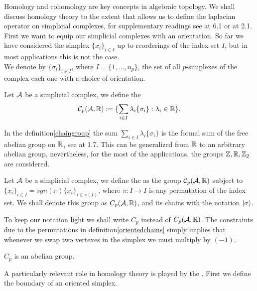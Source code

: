 \documentclass[../1.tex]{subfiles}
\begin{document}
    Homology and cohomology are key concepts in algebraic topology. We shall discuss homology theory to the extent
    that allows us to define the laplacian operator on simplicial complexes, for supplementary readings see \cite{singerthorpe} at 6.1 or \cite{hatcher} at 2.1.
    First we want to equip our simplicial complexes with an orientation. So far we have considered the simplex $\{x_i\}_{i \in I}$ up to reorderings of the index set $I$, but in most applications this is not the case.\\
   
    We denote by $\{\sigma_i\}_{i \in I}$, where $I = \{1,...,n_p\}$, the set of all $p$-simplexes of the complex each one with a choice
    of orientation.

    \begin{defn}
        \label{chaingroup}
        Let $\mathcal{A}$ be a simplicial complex, we define the  
        \[ \mathcal{C}_p(\mathcal{A},\mathbb{R}) := \{ \sum_{i \in I} \lambda_i \{\sigma_i\} : \lambda_i \in \mathbb{R} \}.\]
    \end{defn}

    In the definition\autoref{chaingroup} the sum $\sum_{i \in I} \lambda_i \{\sigma_i\}$ is the formal sum of the free abelian group on $\mathbb{R}$, see \cite{lang} at 1.7.
    This can be generalized from $\mathbb{R}$ to an arbitrary abelian group, nevertheless, for the most of the applications, the groups $\mathbb{Z},\mathbb{R},\mathbb{Z}_2$ are considered. 

    \begin{defn}
        \label{orientedchains}
        Let $\mathcal{A}$ be a simplicial complex, we define the  as
        the group $\mathcal{C}_p(\mathcal{A},\mathbb{R})$ subject to $ \{x_i\}_{i \in I} = sgn(\pi)\{x_i\}_{i \in \pi(I)}$, where $\pi:I \to I$ is 
        any permutation of the index set. We shall denote this group as $C_p(\mathcal{A},\mathbb{R})$, and its chains with the notation $| \sigma \rangle$.
    \end{defn}

    To keep our notation light we shall write $C_p$ instead of $C_p(\mathcal{A},\mathbb{R})$. The constraints due to the 
    permutations in definition\autoref{orientedchains} simply implies that whenever we swap two vertexes in the simplex
    we must multiply by $(-1)$. 
    
    \begin{prop}
        $C_p$ is an abelian group.
    \end{prop}

    A particularly relevant role in homology theory is played by the . First we define the boundary of an oriented simplex.
\end{document}
